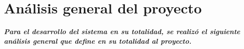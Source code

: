 \chapter{Análisis general del proyecto}
	\paragraph{Para el desarrollo del sistema en su totalidad, se realizó el siguiente análisis general que define en su totalidad al proyecto.}
	
	
	
	